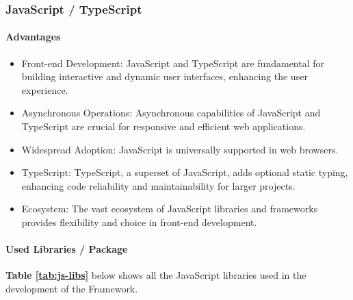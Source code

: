     \subsubsection{JavaScript / TypeScript}
        \paragraph{Advantages}
        \begin{itemize}
            \item Front-end Development: JavaScript and TypeScript are fundamental for building interactive and dynamic user interfaces, enhancing the user experience.
            \item Asynchronous Operations: Asynchronous capabilities of JavaScript and TypeScript are crucial for responsive and efficient web applications.
            \item Widespread Adoption: JavaScript is universally supported in web browsers.
            \item TypeScript: TypeScript, a superset of JavaScript, adds optional static typing, enhancing code reliability and maintainability for larger projects.
            \item Ecosystem: The vast ecosystem of JavaScript libraries and frameworks provides flexibility and choice in front-end development.
        \end{itemize}
        
        \paragraph{Used Libraries / Package}
        \textbf{Table \ref{tab:js-libs}} below shows all the JavaScript libraries used in the development of the Framework.
        
